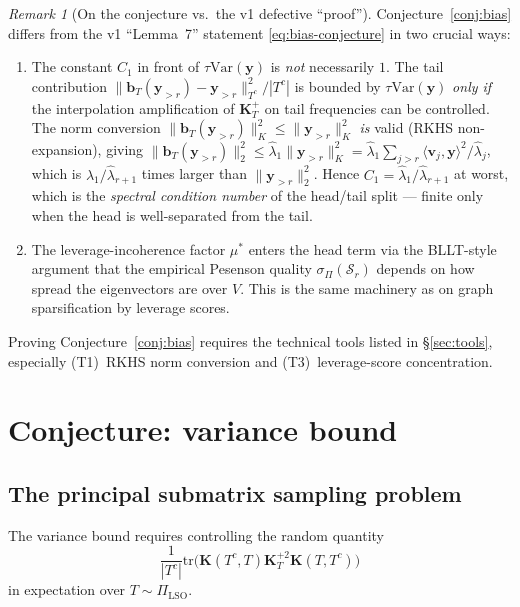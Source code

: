 \documentclass[11pt,a4paper]{article}
\theoremstyle{plain}
\theoremstyle{definition}
\theoremstyle{remark}
\newtheorem{remark}[theorem]{Remark}
\newcommand{\by}{\mathbf{y}}
\newcommand{\bK}{\mathbf{K}}
\newcommand{\bv}{\mathbf{v}}
\newcommand{\bb}{\mathbf{b}}
\newcommand{\Var}{\mathrm{Var}}
\newcommand{\Scal}{\mathcal{S}}
\newcommand{\tr}{\mathrm{tr}}
\begin{document}
\begin{remark}[On the conjecture vs.\ the v1 defective ``proof'']
\label{rem:bias-discussion}
Conjecture~\ref{conj:bias} differs from the v1 ``Lemma~7''
statement \eqref{eq:bias-conjecture} in two crucial ways:
\begin{enumerate}[label=(\arabic*),leftmargin=*]
\item The constant $C_1$ in front of $\tau\Var(\by)$ is \emph{not}
    necessarily $1$. The tail contribution
    $\|\bb_T(\by_{>r}) - \by_{>r}\|_{T^c}^2/|T^c|$ is bounded by
    $\tau\Var(\by)$ \emph{only if} the interpolation amplification
    of $\bK_T^+$ on tail frequencies can be controlled. The norm
    conversion $\|\bb_T(\by_{>r})\|_K^2 \le \|\by_{>r}\|_K^2$
    \emph{is} valid (RKHS non-expansion), giving
    $\|\bb_T(\by_{>r})\|_2^2 \le \hat\lambda_1\|\by_{>r}\|_K^2
    = \hat\lambda_1 \sum_{j > r} \langle \bv_j, \by\rangle^2/\hat\lambda_j$,
    which is $\hat\lambda_1/\hat\lambda_{r+1}$ times larger than
    $\|\by_{>r}\|_2^2$. Hence $C_1 = \hat\lambda_1/\hat\lambda_{r+1}$
    at worst, which is the \emph{spectral condition number} of the
    head/tail split --- finite only when the head is well-separated
    from the tail.
\item The leverage-incoherence factor $\mu^*$ enters the head term
    via the BLLT-style argument that the empirical Pesenson quality
    $\sigma_\Pi(\Scal_r)$ depends on how spread the eigenvectors are
    over $V$. This is the same machinery as
    \citet{AvronBoutsidis2013} on graph sparsification by leverage
    scores.
\end{enumerate}
Proving Conjecture~\ref{conj:bias} requires the technical tools
listed in \S\ref{sec:tools}, especially (T1)~RKHS norm conversion
and (T3)~leverage-score concentration.
\end{remark}

\section{Conjecture: variance bound}
\label{sec:var-conjecture}

\subsection{The principal submatrix sampling problem}

The variance bound requires controlling the random quantity
\begin{equation*}
    \frac{1}{|T^c|}\tr\big(\bK(T^c, T)\bK_T^{+2}\bK(T, T^c)\big)
\end{equation*}
in expectation over $T \sim \Pi_{\mathrm{LSO}}$.
\end{document}
